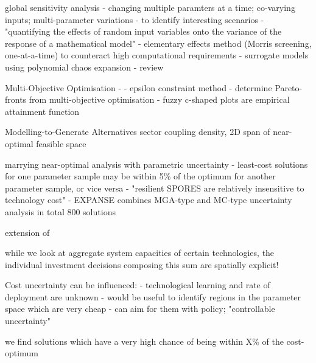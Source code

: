 global sensitivity analysis
- changing multiple paramters at a time; co-varying inputs; multi-parameter variations
- to identify interesting scenarios \cite{usher_value_2015}
- "quantifying the effects of random input variables onto the variance of the response of a mathematical model" \cite{sudret_global_2008}
- elementary effects method (Morris screening, one-at-a-time) to counteract high computational requirements \cite{usher_value_2015} \cite{pizarro-alonso_uncertainties_2019} \cite{moret_robust_2016}
- surrogate models using polynomial chaos expansion
- review \cite{iooss_review_2014}

Multi-Objective Optimisation
- \cite{nearoptimal}
- epsilon constraint method
- determine Pareto-fronts from multi-objective optimisation \cite{mavrotas_effective_2009}
- fuzzy c-shaped plots are empirical attainment function \cite{binois_quantifying_2015} \cite{de_cursi_uncertainty_2021}

Modelling-to-Generate Alternatives
\cite{DeCarolis2016}
\cite{Price2017}
\cite{nacken_integrated_2019} sector coupling
\cite{pedersen_modeling_2020} density, 2D span of near-optimal feasible space


marrying near-optimal analysis with parametric uncertainty
- least-cost solutions for one parameter sample may be within 5\% of the optimum for another parameter sample, or vice versa
- "resilient SPORES are relatively insensitive to technology cost" \cite{lombardi_policy_2020}
- EXPANSE combines MGA-type and MC-type uncertainty analysis in total 800 solutions \cite{Li2017} \cite{Trutnevyte2013}


extension of \cite{nearoptimal}

while we look at aggregate system capacities of certain technologies, the individual investment decisions composing this sum are spatially explicit!

Cost uncertainty can be influenced:
- technological learning and rate of deployment are unknown
- would be useful to identify regions in the parameter space which are very cheap
- can aim for them with policy; "controllable uncertainty"

we find solutions which have a very high chance of being within X\% of the cost-optimum

